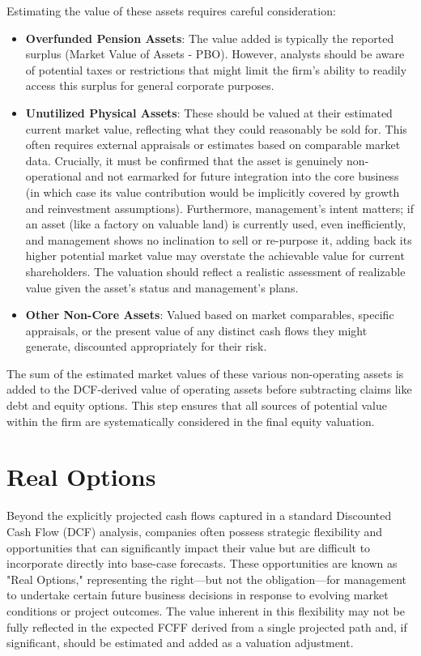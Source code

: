 Estimating the value of these assets requires careful consideration:
\begin{itemize}
    \item \textbf{Overfunded Pension Assets}: The value added is typically the reported surplus (Market Value of Assets - PBO). However, analysts should be aware of potential taxes or restrictions that might limit the firm's ability to readily access this surplus for general corporate purposes.
    \item \textbf{Unutilized Physical Assets}: These should be valued at their estimated current market value, reflecting what they could reasonably be sold for. This often requires external appraisals or estimates based on comparable market data. Crucially, it must be confirmed that the asset is genuinely non-operational and not earmarked for future integration into the core business (in which case its value contribution would be implicitly covered by growth and reinvestment assumptions). Furthermore, management's intent matters; if an asset (like a factory on valuable land) is currently used, even inefficiently, and management shows no inclination to sell or re-purpose it, adding back its higher potential market value may overstate the achievable value for current shareholders. The valuation should reflect a realistic assessment of realizable value given the asset's status and management's plans.
    \item \textbf{Other Non-Core Assets}: Valued based on market comparables, specific appraisals, or the present value of any distinct cash flows they might generate, discounted appropriately for their risk.
\end{itemize}

The sum of the estimated market values of these various non-operating assets is added to the DCF-derived value of operating assets before subtracting claims like debt and equity options. This step ensures that all sources of potential value within the firm are systematically considered in the final equity valuation.

\section{Real Options} \label{sec:real_options}
Beyond the explicitly projected cash flows captured in a standard Discounted Cash Flow (DCF) analysis, companies often possess strategic flexibility and opportunities that can significantly impact their value but are difficult to incorporate directly into base-case forecasts. These opportunities are known as "Real Options," representing the right—but not the obligation—for management to undertake certain future business decisions in response to evolving market conditions or project outcomes. The value inherent in this flexibility may not be fully reflected in the expected FCFF derived from a single projected path and, if significant, should be estimated and added as a valuation adjustment.

